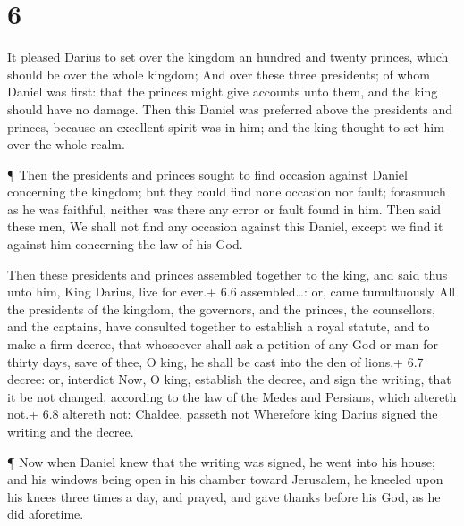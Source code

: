 \hypertarget{section-5}{%
\section{6}\label{section-5}}

 It pleased Darius to set over the kingdom an hundred and
twenty princes, which should be over the whole kingdom;  And
over these three presidents; of whom Daniel was first: that the princes
might give accounts unto them, and the king should have no damage.
 Then this Daniel was preferred above the presidents and
princes, because an excellent spirit was in him; and the king thought to
set him over the whole realm.

 ¶ Then the presidents and princes sought to find occasion
against Daniel concerning the kingdom; but they could find none occasion
nor fault; forasmuch as he was faithful, neither was there any error or
fault found in him.  Then said these men, We shall not find
any occasion against this Daniel, except we find it against him
concerning the law of his God.

 Then these presidents and princes assembled together to the
king, and said thus unto him, King Darius, live for ever.+ 6.6
assembled\ldots: or, came tumultuously  All the presidents
of the kingdom, the governors, and the princes, the counsellors, and the
captains, have consulted together to establish a royal statute, and to
make a firm decree, that whosoever shall ask a petition of any God or
man for thirty days, save of thee, O king, he shall be cast into the den
of lions.+ 6.7 decree: or, interdict  Now, O king, establish
the decree, and sign the writing, that it be not changed, according to
the law of the Medes and Persians, which altereth not.+ 6.8 altereth
not: Chaldee, passeth not  Wherefore king Darius signed the
writing and the decree.

 ¶ Now when Daniel knew that the writing was signed, he
went into his house; and his windows being open in his chamber toward
Jerusalem, he kneeled upon his knees three times a day, and prayed, and
gave thanks before his God, as he did aforetime.

